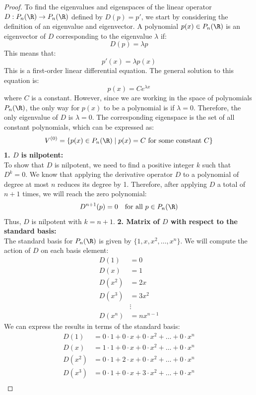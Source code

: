 \documentclass[openany]{book}
\begin{document}
\begin{proof}
To find the eigenvalues and eigenspaces of the linear operator $D: P_n(\R) \to P_n(\R)$ defined by $D(p) = p'$, we start by considering the definition of an eigenvalue and eigenvector. A polynomial $p(x) \in P_n(\R)$ is an eigenvector of $D$ corresponding to the eigenvalue $\lambda$ if:
$$D(p) = \lambda p$$
This means that:
$$p'(x) = \lambda p(x)$$
This is a first-order linear differential equation. The general solution to this equation is:
$$p(x) = Ce^{\lambda x}$$
where $C$ is a constant. However, since we are working in the space of polynomials $P_n(\R)$, the only way for $p(x)$ to be a polynomial is if $\lambda = 0$. Therefore, the only eigenvalue of $D$ is $\lambda = 0$. The corresponding eigenspace is the set of all constant polynomials, which can be expressed as:
$$V^{(0)} = \{p(x) \in P_n(\R) \mid p(x) = C \text{ for some constant } C\}$$
\newline
\textbf{1. $D$ is nilpotent:} \\
To show that $D$ is nilpotent, we need to find a positive integer $k$ such that $D^k = 0$. We know that applying the derivative operator $D$ to a polynomial of degree at most $n$ reduces its degree by 1. Therefore, after applying $D$ a total of $n + 1$ times, we will reach the zero polynomial:
$$D^{n+1}(p) = 0 \quad \text{for all } p \in P_n(\R)$$
Thus, $D$ is nilpotent with $k = n + 1$.
\newline
\textbf{2. Matrix of $D$ with respect to the standard basis:} \\
The standard basis for $P_n(\R)$ is given by $\{1, x, x^2, \ldots, x^n\}$. We will compute the action of $D$ on each basis element:
\[\begin{aligned}
D(1) &= 0 \\
D(x) &= 1 \\
D(x^2) &= 2x \\
D(x^3) &= 3x^2 \\
&\vdots \\
D(x^n) &= nx^{n-1}
\end{aligned}\]
We can express the results in terms of the standard basis:
\[\begin{aligned}
D(1) &= 0 \cdot 1 + 0 \cdot x + 0 \cdot x^2 + \ldots + 0 \cdot x^n \\
D(x) &= 1 \cdot 1 + 0 \cdot x + 0 \cdot x^2 + \ldots + 0 \cdot x^n \\
D(x^2) &= 0 \cdot 1 + 2 \cdot x + 0 \cdot x^2 + \ldots + 0 \cdot x^n \\
D(x^3) &= 0 \cdot 1 + 0 \cdot x + 3 \cdot x^2 + \ldots + 0 \cdot x^n \\

\end{aligned}\]
\end{proof}
\end{document}
